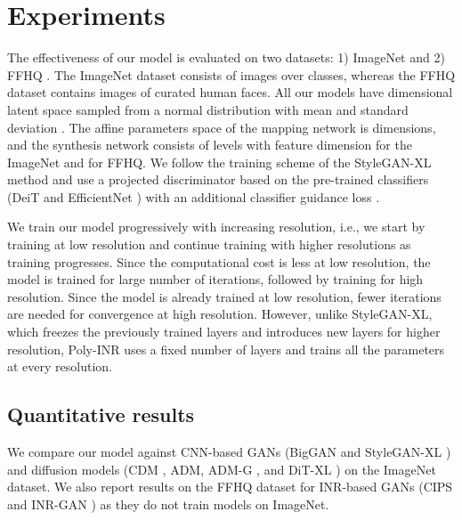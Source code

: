 \section{Experiments}
The effectiveness of our model is evaluated on two datasets: 1) ImageNet \cite{deng2009imagenet} and 2) FFHQ \cite{karras2019style}. The ImageNet dataset consists of  images over  classes, whereas the FFHQ dataset contains  images of curated human faces. All our models have  dimensional latent space sampled from a normal distribution with mean  and standard deviation . The affine parameters space  of the mapping network is  dimensions, and the synthesis network consists of  levels with feature dimension  for the ImageNet and  for FFHQ. We follow the training scheme of the StyleGAN-XL method \cite{sauer2022stylegan} and use a projected discriminator based on the pre-trained classifiers (DeiT \cite{touvron2021training} and EfficientNet \cite{tan2019efficientnet}) with an additional classifier guidance loss \cite{dhariwal2021diffusion}.

We train our model progressively with increasing resolution, i.e., we start by training at low resolution and continue training with higher resolutions as training progresses. Since the computational cost is less at low resolution, the model is trained for large number of iterations, followed by training for high resolution. Since the model is already trained at low resolution, fewer iterations are needed for convergence at high resolution. 
However, unlike StyleGAN-XL, which freezes the previously trained layers and introduces new layers for higher resolution, Poly-INR uses a fixed number of layers and trains all the parameters at every resolution. 




\subsection{Quantitative results}
We compare our model against CNN-based GANs (BigGAN \cite{brock2018large} and StyleGAN-XL \cite{sauer2022stylegan}) and diffusion models (CDM \cite{ho2022cascaded}, ADM, ADM-G \cite{dhariwal2021diffusion}, and DiT-XL \cite{peebles2022scalable}) on the ImageNet dataset. We also report results on the FFHQ dataset for INR-based GANs (CIPS \cite{anokhin2021image} and INR-GAN \cite{skorokhodov2021adversarial}) as they do not train models on ImageNet. 


